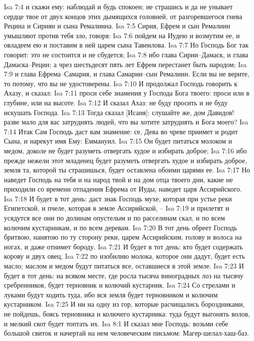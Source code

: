 Isa 7:4  и скажи ему: наблюдай и будь спокоен; не страшись и да не унывает сердце твое от двух концов этих дымящихся головней, от разгоревшегося гнева Рецина и Сириян и сына Ремалиина.
Isa 7:5  Сирия, Ефрем и сын Ремалиин умышляют против тебя зло, говоря:
Isa 7:6  пойдем на Иудею и возмутим ее, и овладеем ею и поставим в ней царем сына Тавеилова.
Isa 7:7  Но Господь Бог так говорит: это не состоится и не сбудется;
Isa 7:8  ибо глава Сирии--Дамаск, и глава Дамаска--Рецин; а чрез шестьдесят пять лет Ефрем перестанет быть народом;
Isa 7:9  и глава Ефрема--Самария, и глава Самарии--сын Ремалиин. Если вы не верите, то потому, что вы не удостоверены.
Isa 7:10  И продолжал Господь говорить к Ахазу, и сказал:
Isa 7:11  проси себе знамения у Господа Бога твоего: проси или в глубине, или на высоте.
Isa 7:12  И сказал Ахаз: не буду просить и не буду искушать Господа.
Isa 7:13  Тогда сказал [Исаия]: слушайте же, дом Давидов! разве мало для вас затруднять людей, что вы хотите затруднять и Бога моего?
Isa 7:14  Итак Сам Господь даст вам знамение: се, Дева во чреве приимет и родит Сына, и нарекут имя Ему: Еммануил.
Isa 7:15  Он будет питаться молоком и медом, доколе не будет разуметь отвергать худое и избирать доброе;
Isa 7:16  ибо прежде нежели этот младенец будет разуметь отвергать худое и избирать доброе, земля та, которой ты страшишься, будет оставлена обоими царями ее.
Isa 7:17  Но наведет Господь на тебя и на народ твой и на дом отца твоего дни, какие не приходили со времени отпадения Ефрема от Иуды, наведет царя Ассирийского.
Isa 7:18  И будет в тот день: даст знак Господь мухе, которая при устье реки Египетской, и пчеле, которая в земле Ассирийской, --
Isa 7:19  и прилетят и усядутся все они по долинам опустелым и по расселинам скал, и по всем колючим кустарникам, и по всем деревам.
Isa 7:20  В тот день обреет Господь бритвою, нанятою по ту сторону реки, царем Ассирийским, голову и волоса на ногах, и даже отнимет бороду.
Isa 7:21  И будет в тот день: кто будет содержать корову и двух овец,
Isa 7:22  по изобилию молока, которое они дадут, будет есть масло; маслом и медом будут питаться все, оставшиеся в этой земле.
Isa 7:23  И будет в тот день: на всяком месте, где росла тысяча виноградных лоз на тысячу сребренников, будет терновник и колючий кустарник.
Isa 7:24  Со стрелами и луками будут ходить туда, ибо вся земля будет терновником и колючим кустарником.
Isa 7:25  И ни на одну из гор, которые расчищались бороздниками, не пойдешь, боясь терновника и колючего кустарника: туда будут выгонять волов, и мелкий скот будет топтать их.
Isa 8:1  И сказал мне Господь: возьми себе большой свиток и начертай на нем человеческим письмом: Магер-шелал-хаш-баз.
